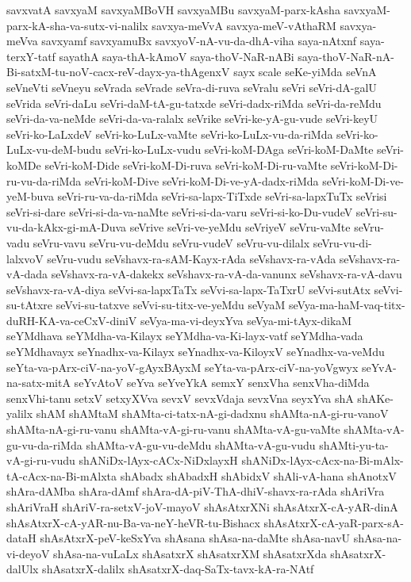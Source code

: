 {savxvatA
savxyaM
savxyaMBoVH
savxyaMBu
savxyaM-parx-kAsha
savxyaM-parx-kA-sha-va-sutx-vi-nalilx
savxya-meVvA
savxya-meV-vAthaRM
savxya-meVva
savxyamf
savxyamuBx
savxyoV-nA-vu-da-dhA-viha
saya-nAtxnf
saya-terxY-tatf
sayathA
saya-thA-kAmoV
saya-thoV-NaR-nABi
saya-thoV-NaR-nA-Bi-satxM-tu-noV-cacx-reV-dayx-ya-thAgenxV
sayx
scale
seKe-yiMda
seVnA
seVneVti
seVneyu
seVrada
seVrade
seVra-di-ruva
seVralu
seVri
seVri-dA-galU
seVrida
seVri-daLu
seVri-daM-tA-gu-tatxde
seVri-dadx-riMda
seVri-da-reMdu
seVri-da-va-neMde
seVri-da-va-ralalx
seVrike
seVri-ke-yA-gu-vude
seVri-keyU
seVri-ko-LaLxdeV
seVri-ko-LuLx-vaMte
seVri-ko-LuLx-vu-da-riMda
seVri-ko-LuLx-vu-deM-budu
seVri-ko-LuLx-vudu
seVri-koM-DAga
seVri-koM-DaMte
seVri-koMDe
seVri-koM-Dide
seVri-koM-Di-ruva
seVri-koM-Di-ru-vaMte
seVri-koM-Di-ru-vu-da-riMda
seVri-koM-Dive
seVri-koM-Di-ve-yA-dadx-riMda
seVri-koM-Di-ve-yeM-buva
seVri-ru-va-da-riMda
seVri-sa-lapx-TiTxde
seVri-sa-lapxTuTx
seVrisi
seVri-si-dare
seVri-si-da-va-naMte
seVri-si-da-varu
seVri-si-ko-Du-vudeV
seVri-su-vu-da-kAkx-gi-mA-Duva
seVrive
seVri-ve-yeMdu
seVriyeV
seVru-vaMte
seVru-vadu
seVru-vavu
seVru-vu-deMdu
seVru-vudeV
seVru-vu-dilalx
seVru-vu-di-lalxvoV
seVru-vudu
seVshavx-ra-sAM-Kayx-rAda
seVshavx-ra-vAda
seVshavx-ra-vA-dada
seVshavx-ra-vA-dakekx
seVshavx-ra-vA-da-vanunx
seVshavx-ra-vA-davu
seVshavx-ra-vA-diya
seVvi-sa-lapxTaTx
seVvi-sa-lapx-TaTxrU
seVvi-sutAtx
seVvi-su-tAtxre
seVvi-su-tatxve
seVvi-su-titx-ve-yeMdu
seVyaM
seVya-ma-haM-vaq-titx-duRH-KA-va-ceCxV-diniV
seVya-ma-vi-deyxYva
seVya-mi-tAyx-dikaM
seYMdhava
seYMdha-va-Kilayx
seYMdha-va-Ki-layx-vatf
seYMdha-vada
seYMdhavayx
seYnadhx-va-Kilayx
seYnadhx-va-KiloyxV
seYnadhx-va-veMdu
seYta-va-pArx-ciV-na-yoV-gAyxBAyxM
seYta-va-pArx-ciV-na-yoVgwyx
seYvA-na-satx-mitA
seYvAtoV
seYva
seYveYkA
semxY
senxVha
senxVha-diMda
senxVhi-tanu
setxV
setxyXVva
sevxV
sevxVdaja
sevxVna
seyxYva
shA
shAKe-yalilx
shAM
shAMtaM
shAMta-ci-tatx-nA-gi-dadxnu
shAMta-nA-gi-ru-vanoV
shAMta-nA-gi-ru-vanu
shAMta-vA-gi-ru-vanu
shAMta-vA-gu-vaMte
shAMta-vA-gu-vu-da-riMda
shAMta-vA-gu-vu-deMdu
shAMta-vA-gu-vudu
shAMti-yu-ta-vA-gi-ru-vudu
shANiDx-lAyx-cACx-NiDxlayxH
shANiDx-lAyx-cAcx-na-Bi-mAlx-tA-cAcx-na-Bi-mAlxta
shAbadx
shAbadxH
shAbidxV
shAli-vA-hana
shAnotxV
shAra-dAMba
shAra-dAmf
shAra-dA-piV-ThA-dhiV-shavx-ra-rAda
shAriVra
shAriVraH
shAriV-ra-setxV-joV-mayoV
shAsAtxrXNi
shAsAtxrX-cA-yAR-dinA
shAsAtxrX-cA-yAR-nu-Ba-va-neY-heVR-tu-Bishacx
shAsAtxrX-cA-yaR-parx-sA-dataH
shAsAtxrX-peV-keSxYva
shAsana
shAsa-na-daMte
shAsa-navU
shAsa-na-vi-deyoV
shAsa-na-vuLaLx
shAsatxrX
shAsatxrXM
shAsatxrXda
shAsatxrX-dalUlx
shAsatxrX-dalilx
shAsatxrX-daq-SaTx-tavx-kA-ra-NAtf
}
